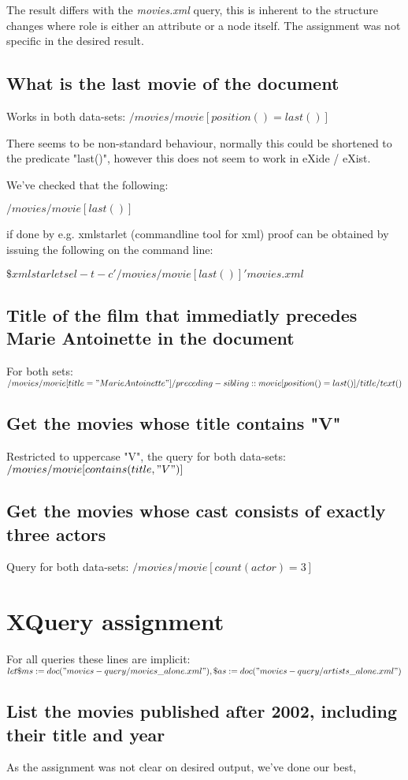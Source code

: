 \documentclass{article}
\begin{document}
The result differs with the \emph{movies.xml} query, this is inherent
to the structure changes where role is either an attribute or a node
itself. The assignment was not specific in the desired result.

\subsection{What is the last movie of the document}
Works in both data-sets:
$/movies/movie[position()=last()]$

There seems to be non-standard behaviour, normally this could be
shortened to the predicate "last()", however this does not seem to
work in eXide / eXist. 

We've checked that the following: 

$/movies/movie[last()]$

if done by e.g. xmlstarlet (commandline tool for xml) proof can be
obtained by issuing the following on the command line:

$\$ xmlstarlet sel -t -c '/movies/movie[last()]' movies.xml$


\subsection{Title of the film that immediatly precedes Marie
  Antoinette in the document}
For both sets:
$/movies/movie[title="Marie Antoinette"]/preceding-sibling::movie[position()=last()]/title/text()$

\subsection{Get the movies whose title contains "V"}
Restricted to uppercase "V", the query for both data-sets:
$/movies/movie[contains(title, "V")]$

\subsection{Get the movies whose cast consists of exactly three
  actors}
Query for both data-sets:
$/movies/movie[count(actor) = 3]$

\section{XQuery assignment}
For all queries these lines are implicit:
$let \$ms:=doc("movies-query/movies\_alone.xml"),
\$as:=doc("movies-query/artists\_alone.xml")
$
\subsection{List the movies published after 2002, including their
  title and year}
As the assignment was not clear on desired output, we've done our best,
\end{document}
